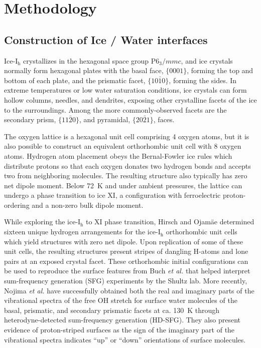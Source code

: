 \section{Methodology}
\subsection{Construction of Ice / Water interfaces}
Ice-I$_\mathrm{h}$ crystallizes in the hexagonal space group
P$6_3/mmc$, and ice crystals normally form hexagonal plates with the
basal face, $\{0001\}$, forming the top and bottom of each plate, and
the prismatic facet, $\{10\bar{1}0\}$, forming the sides.  In extreme
temperatures or low water saturation conditions, ice crystals can form
hollow columns, needles, and dendrites, exposing other crystalline
facets of the ice to the surroundings.  Among the more
commonly-observed facets are the secondary prism, $\{11\bar{2}0\}$,
and pyramidal, $\{20\bar{2}1\}$, faces.

The oxygen lattice is a hexagonal unit cell comprising 4 oxygen atoms,
but it is also possible to construct an equivalent orthorhombic unit
cell with 8 oxygen atoms.\cite{Hirsch2004} Hydrogen atom placement
obeys the Bernal-Fowler ice rules which distribute protons so that
each oxygen donates two hydrogen bonds and accepts two from
neighboring molecules.\cite{Bernal1933} The resulting structure also
typically has zero net dipole moment. Below 72~K and under ambient
pressures, the lattice can undergo a phase transition to ice XI, a
configuration with ferroelectric proton-ordering and a non-zero bulk
dipole moment.

While exploring the ice-I$_\mathrm{h}$ to XI phase transition, Hirsch
and Ojam\"{a}e determined sixteen unique hydrogen arrangements for the
ice-I$_\mathrm{h}$ orthorhombic unit cells which yield structures with
zero net dipole.\cite{Hirsch2004} Upon replication of some of these
unit cells, the resulting structures present stripes of dangling
H-atoms and lone pairs at an exposed crystal facet. These orthorhombic
initial configurations can be used to reproduce the surface features
from Buch \textit{et al.}\cite{Buch2008} that helped interpret
sum-frequency generation (SFG) experiments by the Shultz
lab.\cite{Groenzin07} More recently, Nojima \textit{et
  al.}\cite{Nojima2017} have successfully obtained both the real and
imaginary parts of the vibrational spectra of the free OH stretch for
surface water molecules of the basal, prismatic, and secondary
prismatic facets at ca. 130~K through heterodyne-detected
sum-frequency generation (HD-SFG). They also present evidence of
proton-striped surfaces as the sign of the imaginary part of the
vibrational spectra indicates ``up'' or ``down'' orientations of
surface molecules.

